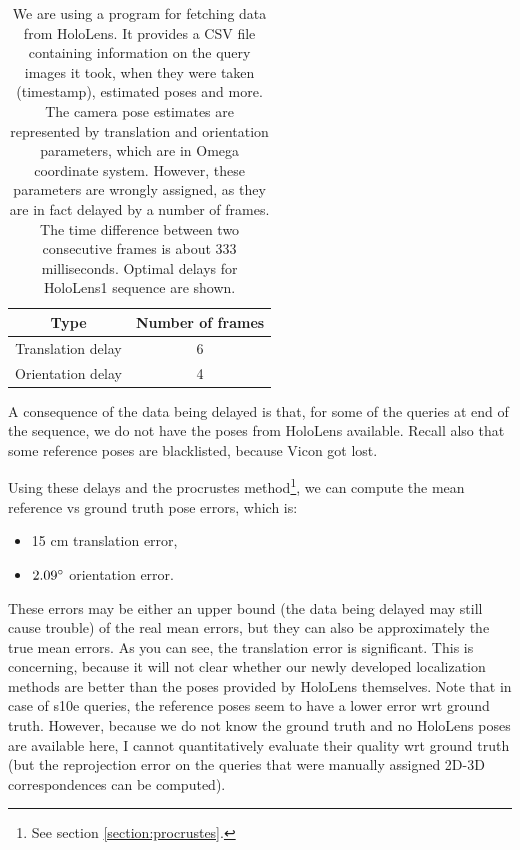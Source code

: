 \documentclass[twoside]{ctuthesis}
\theoremstyle{plain}
\theoremstyle{definition}
\theoremstyle{note}
\newcommand{\code}[1]{{\ttfamily #1%
}}
\begin{document}
\begin{table}[ht]
    \centering
    {\footnotesize
	\begin{tabular}{|c|c|}
	\hline
	Type & Number of frames \\[1pt]
	\hline
	Translation delay & 6 \\[1pt]
	Orientation delay & 4 \\[1pt]
	\hline
    \end{tabular}
	\caption[Optimal HoloLens delay parameters]{We are using a program \cite{HoloLensDataAcquisition} for fetching data from HoloLens. It provides a CSV file containing information on the query images it took, when they were taken (timestamp), estimated poses and more. The camera pose estimates are represented by translation and orientation parameters, which are in Omega coordinate system. However, these parameters are wrongly assigned, as they are in fact delayed by a number of frames. The time difference between two consecutive frames is about 333 milliseconds. Optimal delays for HoloLens1 sequence are shown.}
	\label{tab:HL-pose-delays}
    }
\end{table}

A consequence of the data being delayed is that, for some of the queries at end of the sequence, we do not have the poses from HoloLens available. Recall also that some reference poses are blacklisted, because Vicon got lost.

Using these delays and the \code{procrustes} method\footnote{See section \ref{section:procrustes}.}, we can compute the mean reference vs ground truth pose errors, which is:

\begin{itemize}
	\item 15 cm translation error,
	\item $2.09\degree$ orientation error.
\end{itemize}

These errors may be either an upper bound (the data being delayed may still cause trouble) of the real mean errors, but they can also be approximately the true mean errors. As you can see, the translation error is significant. This is concerning, because it will not clear whether our newly developed localization methods are better than the poses provided by HoloLens themselves. Note that in case of s10e queries, the reference poses seem to have a lower error wrt ground truth. However, because we do not know the ground truth and no HoloLens poses are available here, I cannot quantitatively evaluate their quality wrt ground truth (but the reprojection error on the queries that were manually assigned 2D-3D correspondences can be computed).
\end{document}
